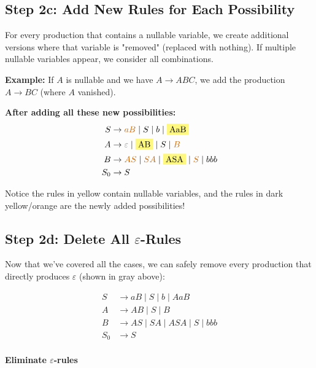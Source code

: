 \documentclass{article}
\begin{document}
\subsection{Step 2c: Add New Rules for Each Possibility}

For every production that contains a nullable variable, we create additional versions where that variable is "removed" (replaced with nothing). If multiple nullable variables appear, we consider all combinations.


\noindent\textbf{Example:} If $A$ is nullable and we have $A \to ABC$, we add the production $A \to BC$ (where $A$ vanished).


\noindent\textbf{After adding all these new possibilities:}
\begin{align*}
    S &\to \textcolor{orange!80!black}{aB}
     \mid S
     \mid b
     \mid \colorbox{yellow!50}{AaB}
    \\
    A &\to \textcolor{gray}{\varepsilon}
     \mid \colorbox{yellow!50}{AB}
     \mid S
     \mid \textcolor{orange!80!black}{B}
    \\
    B &\to \textcolor{orange!80!black}{AS}
     \mid \textcolor{orange!80!black}{SA}
     \mid \colorbox{yellow!50}{ASA}
     \mid \textcolor{orange!80!black}{S}
     \mid bbb
    \\
    S_0 &\to S
    \\
    \end{align*}

Notice the rules in yellow contain nullable variables, and the rules in dark yellow/orange are the newly added possibilities!

\subsection{Step 2d: Delete All $\varepsilon$-Rules}

Now that we've covered all the cases, we can safely remove every production that directly produces $\varepsilon$ (shown in gray above):

\begin{align*}
    S &\to aB  \mid S  \mid b  \mid AaB \\
    A &\to AB  \mid S  \mid B \\
    B &\to AS  \mid SA  \mid ASA  \mid S  \mid bbb \\
    S_0 &\to S \\
    \end{align*}

\vspace{0.2cm}
\noindent\textcolor{green!60!black}{\textbf{ Eliminate $\varepsilon$-rules}}
\end{document}
